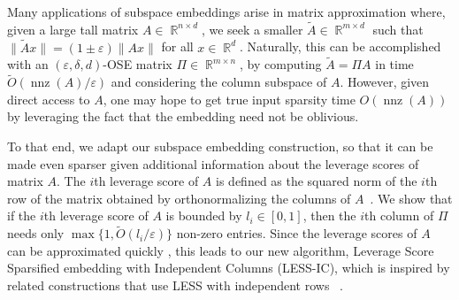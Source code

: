 \documentclass[11pt]{amsart}
\numberwithin{equation}{section}
\numberwithin{equation}{section}
\DeclareMathOperator{\R}{\mathbb{R}}
\DeclareMathOperator{\nnz}{nnz}
\theoremstyle{remark}
\theoremstyle{definition}
\begin{document}
Many applications of subspace embeddings arise in matrix approximation \cite{woodruff2014sketching} where, given a large tall matrix $A\in\R^{n\times d}$, we seek a smaller $\tilde A\in\R^{m\times d}$ such that $\|\tilde A x\|=(1\pm\varepsilon)\|Ax\|$ for all $x\in\R^d$. 
Naturally, this can be accomplished with an $(\varepsilon,\delta,d)$-OSE matrix $\Pi\in\R^{m\times n}$, by computing $\tilde A=\Pi A$ in time $\tilde O(\nnz(A)/\varepsilon)$ and considering the column subspace of $A$. However, given direct access to $A$, one may hope to get true input sparsity time $O(\nnz(A))$ by leveraging the fact that the embedding need not be oblivious.

To that end, we adapt our subspace embedding construction, so that it can be made even sparser given additional information about the leverage scores of matrix $A$. The $i$th leverage score of $A$ is defined as the squared norm of the $i$th row of the matrix obtained by orthonormalizing the columns of $A$~\cite{drineas2006sampling}. We show that if the $i$th leverage score of $A$ is bounded by $l_i\in[0,1]$, then the $i$th column of $\Pi$ needs only $\max\{1,\tilde O(l_i/\varepsilon)\}$ non-zero entries. Since the leverage scores of $A$ can be approximated quickly \cite{drineas2012fast}, this leads to our new algorithm, Leverage Score Sparsified embedding with Independent Columns (LESS-IC), which is inspired by related constructions that use LESS with independent rows ~\cite{less-embeddings,newton-less,gaussianization}.
\end{document}

